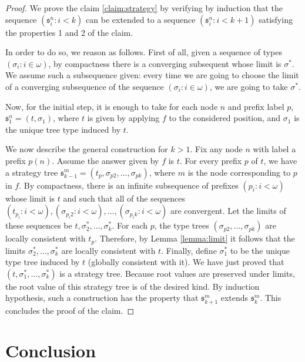 \documentclass{llncs}
\begin{document}
\begin{proof}
We prove the claim \ref{claim:strategy} by verifying by induction that the sequence $(\mathfrak{s}^n_i: i < k)$ can be extended to a sequence $(\mathfrak{s}^n_i: i < k+1)$ satisfying the properties 1 and 2 of the claim. 



In order to do so, we reason as follows. First of all, given a sequence of types $(\sigma_i : i \in \omega)$, by compactness there is a converging subsequent whose limit is  $\sigma^*$. We assume such a subsequence given: every time we are going to choose the limit of a converging  subsequence of the sequence $(\sigma_i : i \in \omega)$, we are going to take $\sigma^*$.

Now, for the initial step, it is enough to take for each node $n$ and prefix label $p$, $\mathfrak{s}^n_1=(t, \sigma_1)$, where $t$ is given by applying $f$ to the considered position, and $\sigma_1$ is the unique tree type induced by $t$. 

We now describe the general construction for $k>1$. Fix any node $n$ with label a prefix $p(n)$. Assume the answer given by $f$ is $t$. For every prefix $p$ of $t$, we have a strategy tree $\mathfrak{s}^m_{k-1}=(t_p, \sigma_{p2}, \dots, \sigma_{pk})$, where $m$ is the node corresponding to $p$ in $f$. 
By compactness, there is an infinite subsequence of prefixes $(p_i: i < \omega)$ whose limit is $t$ and such that all of the sequences
$(t_{p_i}: i <\omega ), (\sigma_{p_i2}: i <\omega ), \dots,  (\sigma_{p_ik}: i <\omega )$ are convergent. Let the limits of these sequences be $t, \sigma^*_2, \dots, \sigma^*_k$.
For each $p$, the type trees $(\sigma_{p2}, \dots, \sigma_{pk})$
are locally consistent with $t_p$. Therefore, by Lemma \ref{lemma:limit} it follows that the limits $\sigma^*_2, \dots, \sigma^*_k$ are locally consistent with $t$. Finally, define $\sigma^*_1$ to be the unique type tree induced by  $t$ (globally consistent with it). We have just proved that
$(t, \sigma^*_1, \dots, \sigma^*_k)$
is a strategy tree. Because root values are preserved under limits, the root value
of this strategy tree is of the desired kind. By induction hypothesis, such a construction has the property that $\mathfrak{s}^m_{k+1}$ extends $\mathfrak{s}^m_{k}$. This concludes the proof of the claim.
  \end{proof}






\section{Conclusion}
\end{document}
